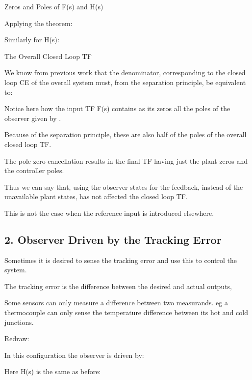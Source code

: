  

 
Zeros and Poles of F(s) and H(s)

Applying the theorem:
 
Similarly for H(s):
 

 
The Overall Closed Loop TF

 
 
We know from previous work that the denominator, corresponding to the closed loop CE of the overall system must, from the separation principle, be equivalent to:
 
 
 

Notice here how the input TF F(s) contains as its zeros all the poles of the observer given by  .

Because of the separation principle, these are also half of the poles of the overall closed loop TF.

The pole-zero cancellation results in the final TF having just the plant zeros and the controller poles.

Thus we can say that, using the observer states for the feedback, instead of the unavailable plant states, has not affected the closed loop TF.

This is not the case when the reference input is introduced elsewhere.


 
\subsection{2. Observer Driven by the Tracking Error
} %
\label{sub:2_observer_driven_by_the_tracking_error_}

Sometimes it is desired to sense the tracking error and use this to control the system.

The tracking error is the difference between the desired and actual outputs,
 
Some sensors can only measure a difference between two measurands. eg  a thermocouple can only sense the temperature difference between its hot and cold junctions.








Redraw:





 
In this configuration the observer is driven by:
 
Here H(s) is the same as before:

